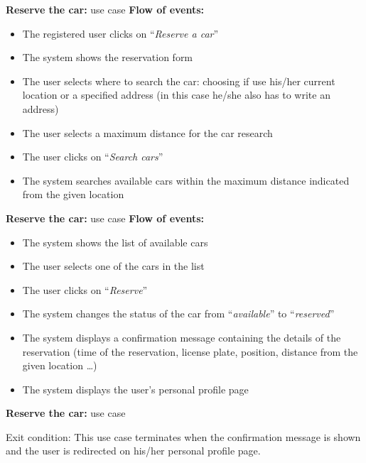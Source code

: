 \documentclass{beamer}
\begin{document}
	\begin{frame} {\textbf{Reserve the car:} use case}
		\textbf{Flow of events:}\\
			\begin{itemize} 
				\item The registered user clicks on ``\textit{Reserve a car}''
				\item The system shows the reservation form
				\item The user selects where to search the car: choosing if use his/her current location or a specified address (in this case he/she also has to write an address)
				\item The user selects a maximum distance for the car research
				\item The user clicks on ``\textit{Search cars}''
				\item The system searches available cars within the maximum distance indicated from the given location
			\end{itemize}
	\end{frame}

	\begin{frame} {\textbf{Reserve the car:} use case}
		\textbf{Flow of events:}\\
		\begin{itemize} 
			\item The system shows the list of available cars
			\item The user selects one of the cars in the list
			\item The user clicks on ``\textit{Reserve}''
			\item The system changes the status of the car from ``\textit{available}'' to ``\textit{reserved}''
			\item The system displays a confirmation message containing the details of the reservation (time of the reservation, license plate, position, distance from the given location \ldots)
			\item The system displays the user's personal profile page
		\end{itemize}
	\end{frame}
	
	\begin{frame}{\textbf{Reserve the car:} use case}
		\begin{block}{Exit condition:}
			This use case terminates when the confirmation message is shown and the user is redirected on his/her personal profile page.\\
		\end{block}
	\end{frame}
\end{document}
